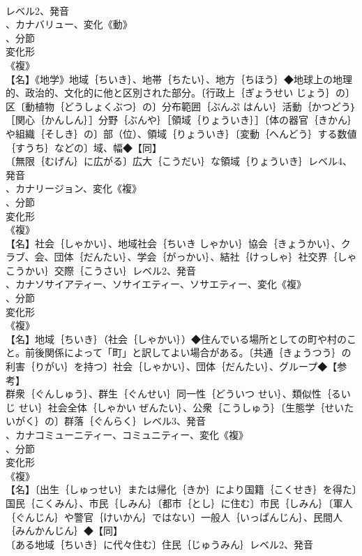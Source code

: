 \documentclass[8pt]{extreport}
\begin{document}
\begin{CJK}{UTF8}{min}
\\	レベル2、発音
\\	、カナバリュー、変化《動》
\\	、分節
\\	変化形 
\\	《複》
\\	【名】《地学》地域｛ちいき｝、地帯｛ちたい｝、地方｛ちほう｝◆地球上の地理的、政治的、文化的に他と区別された部分。〔行政上｛ぎょうせい じょう｝の〕区〔動植物｛どうしょくぶつ｝の〕分布範囲｛ぶんぷ はんい｝活動｛かつどう｝［関心｛かんしん｝］分野｛ぶんや｝［領域｛りょういき｝］〔体の器官｛きかん｝や組織｛そしき｝の〕部（位）、領域｛りょういき｝〔変動｛へんどう｝する数値｛すうち｝などの〕域、幅◆【同】
\\	〔無限｛むげん｝に広がる〕広大｛こうだい｝な領域｛りょういき｝レベル4、発音
\\	、カナリージョン、変化《複》
\\	、分節
\\	変化形 
\\	《複》
\\	【名】社会｛しゃかい｝、地域社会｛ちいき しゃかい｝協会｛きょうかい｝、クラブ、会、団体｛だんたい｝、学会｛がっかい｝、結社｛けっしゃ｝社交界｛しゃこうかい｝交際｛こうさい｝レベル2、発音
\\	、カナソサイアティー、ソサイエティー、ソサエティー、変化《複》
\\	、分節
\\	変化形 
\\	《複》
\\	【名】地域｛ちいき｝（社会｛しゃかい｝）◆住んでいる場所としての町や村のこと。前後関係によって「町」と訳してよい場合がある。〔共通｛きょうつう｝の利害｛りがい｝を持つ〕社会｛しゃかい｝、団体｛だんたい｝、グループ◆【参考】
\\	群衆｛ぐんしゅう｝、群生｛ぐんせい｝同一性｛どういつ せい｝、類似性｛るいじ せい｝社会全体｛しゃかい ぜんたい｝、公衆｛こうしゅう｝〔生態学｛せいたいがく｝の〕群落｛ぐんらく｝レベル3、発音
\\	、カナコミューニティー、コミュニティー、変化《複》
\\	、分節
\\	変化形 
\\	《複》
\\	【名】〔出生｛しゅっせい｝または帰化｛きか｝により国籍｛こくせき｝を得た〕国民｛こくみん｝、市民｛しみん｝〔都市｛とし｝に住む〕市民｛しみん｝〔軍人｛ぐんじん｝や警官｛けいかん｝ではない〕一般人｛いっぱんじん｝、民間人｛みんかんじん｝◆【同】
\\	〔ある地域｛ちいき｝に代々住む〕住民｛じゅうみん｝レベル2、発音

\end{CJK}
\end{document}
